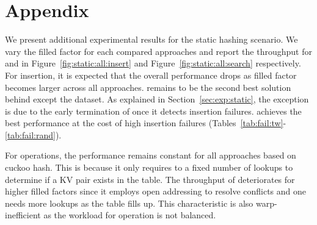 

\section*{Appendix}

We present additional experimental results for the static hashing scenario. We vary the filled factor for each compared approaches and report the throughput for  and  in Figure~\ref{fig:static:all:insert} and Figure~\ref{fig:static:all:search} respectively.
For insertion, it is expected that the overall performance drops as filled factor becomes larger across all approaches. 
\voter remains to be the second best solution behind \megakv except the \dsali dataset. As explained in Section~\ref{sec:exp:static}, the exception is due to the early termination of \cudpp once it detects insertion failures. \megakv achieves the best performance at the cost of high insertion failures (Tables~\ref{tab:fail:tw}-\ref{tab:fail:rand}). 

For  operations, the performance remains constant for all approaches based on cuckoo hash. This is because it only requires to a fixed number of lookups to determine if a KV pair exists in the table. The throughput of \linear deteriorates for higher filled factors since it employs open addressing to resolve conflicts and one needs more lookups as the table fills up. This characteristic is also warp-inefficient as the workload for  operation is not balanced.   

